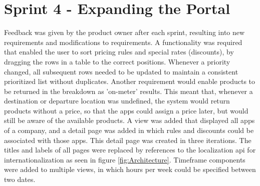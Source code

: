 %
\section{Sprint 4 - Expanding the Portal}
Feedback was given by the product owner after each sprint, resulting into new requirements and modifications to requirements. A functionality was required that enabled the user to sort pricing rules and special rates (discounts), by dragging the rows in a table to the correct positions. Whenever a priority changed, all subsequent rows needed to be updated to maintain a consistent prioritized list without duplicates. Another requirement would enable products to be returned in the breakdown as 'on-meter' results. This meant that, whenever a destination or departure location was undefined, the system would return products without a price, so that the apps could assign a price later, but would still be aware of the available products. A view was added that displayed all apps of a company, and a detail page was added in which rules and discounts could be associated with those apps. This detail page was created in three iterations. The titles and labels of all pages were replaced by references to the localization api for internationalization as seen in figure \ref{fig:Architecture}. Timeframe components were added to multiple views, in which hours per week could be specified between two dates.

%
